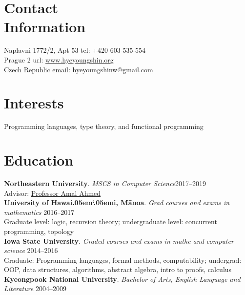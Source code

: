 \documentclass[margin,line]{resume}
\begin{document}
\newcommand{\Hawaii}{Hawai\kern.05em`\kern.05em\relax i}
\newcommand{\Manoa}{M\=anoa}

\begin{resume}

    \section{\mysidestyle Contact\\Information}
     Naplavni 1772/2, Apt 53          \hfill tel: +420 603-535-554\\
     Prague 2                 \hfill url: \href{https://hyeyoungshin.github.io/}{www.hyeyoungshin.org}\\
     Czech Republic  \hfill             \hfill email:  \href{mailto:hyeyoungshinw@gmail.com}{hyeyoungshinw@gmail.com}

    \section{\mysidestyle Interests}

    Programming languages, type theory, and functional programming
    
    \section{\mysidestyle Education}

    \newcommand\mysmallskip{4pt}
    \newcommand\mymedskip{6pt}
    \newcommand\mybigskip{8pt}

    \textbf{Northeastern University}. \textsl{MSCS in Computer Science}\hfill 2017--2019\\
    Advisor: \href{http://www.ccs.neu.edu/home/amal/}{Professor Amal Ahmed}\\[\mymedskip]
    \textbf{University of \Hawaii, \Manoa}. \textsl{Grad courses and exams in mathematics} \hfill 2016--2017\\  %
    \footnotesize{Graduate level: logic, recursion theory; undergraduate level: concurrent programming, topology} \\[\mymedskip]
    \textbf{Iowa State University}. \textsl{Graded courses and exams in mathe and computer science} \hfill 2014--2016\\
    \footnotesize{Graduate: Programming languages, formal methods, computability; undergrad: OOP, data structures, algorithms, abstract algebra, intro to proofs, calculus} \\[\mymedskip]
    \textbf{Kyeongpook National University}. \textsl{Bachelor of Arts, English Language and Literature} \hfill 2004--2009  %
    


\end{resume}
\end{document}
